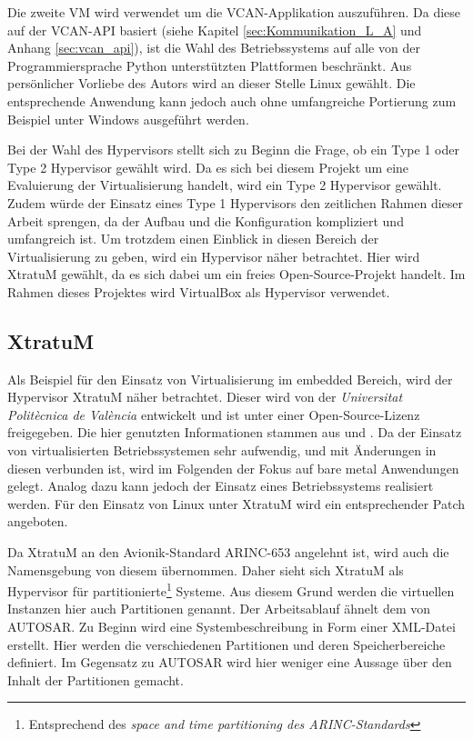 \documentclass[
  a4paper,					    %
  twoside,
  DIV=calc,     				%
  bibliography=totoc,
  cleardoublepage=empty,
  ngerman,     					%
  final       					%
]{scrbook}
\begin{document}
Die zweite VM wird verwendet um die VCAN-Applikation auszuführen. Da diese auf der VCAN-API basiert (siehe Kapitel \ref{sec:Kommunikation_L_A} und Anhang \ref{sec:vcan_api}), ist die Wahl des Betriebssystems auf alle von der Programmiersprache Python unterstützten Plattformen beschränkt. Aus persönlicher Vorliebe des Autors wird an dieser Stelle Linux gewählt. Die entsprechende Anwendung kann jedoch auch ohne umfangreiche Portierung zum Beispiel unter Windows ausgeführt werden.

Bei der Wahl des Hypervisors stellt sich zu Beginn die Frage, ob ein Type 1 oder Type 2 Hypervisor gewählt wird. Da es sich bei diesem Projekt um eine Evaluierung der Virtualisierung handelt, wird ein Type 2 Hypervisor gewählt. Zudem würde der Einsatz eines Type 1 Hypervisors den zeitlichen Rahmen dieser Arbeit sprengen, da der Aufbau und die Konfiguration kompliziert und umfangreich ist. Um trotzdem einen Einblick in diesen Bereich der Virtualisierung zu geben, wird ein Hypervisor näher betrachtet. Hier wird XtratuM gewählt, da es sich dabei um ein freies Open-Source-Projekt handelt. Im Rahmen dieses Projektes wird VirtualBox als Hypervisor verwendet.

\subsection{XtratuM}
\label{sec:xtratum}
Als Beispiel für den Einsatz von Virtualisierung im embedded Bereich, wird der Hypervisor XtratuM näher betrachtet. Dieser wird von der \emph{Universitat Politècnica de València} entwickelt und ist unter einer Open-Source-Lizenz freigegeben. Die hier genutzten Informationen stammen aus \cite{xm:usermanual} und \cite{xm:reference}. Da der Einsatz von virtualisierten Betriebssystemen sehr aufwendig, und mit Änderungen in diesen verbunden ist, wird im Folgenden der Fokus auf bare metal Anwendungen gelegt. Analog dazu kann jedoch der Einsatz eines Betriebssystems realisiert werden. Für den Einsatz von Linux unter XtratuM wird ein entsprechender Patch angeboten.

Da XtratuM an den Avionik-Standard ARINC-653 angelehnt ist, wird auch die Namensgebung von diesem übernommen. Daher sieht sich XtratuM als Hypervisor für partitionierte\footnote{Entsprechend des \emph{space and time partitioning des ARINC-Standards}} Systeme. Aus diesem Grund werden die virtuellen Instanzen hier auch Partitionen genannt. Der Arbeitsablauf ähnelt dem von AUTOSAR. Zu Beginn wird eine Systembeschreibung in Form einer XML-Datei erstellt. Hier werden die verschiedenen Partitionen und deren Speicherbereiche definiert. Im Gegensatz zu AUTOSAR wird hier weniger eine Aussage über den Inhalt der Partitionen gemacht.
\end{document}
